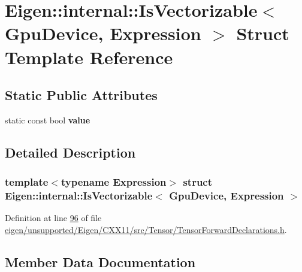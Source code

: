 \hypertarget{struct_eigen_1_1internal_1_1_is_vectorizable_3_01_gpu_device_00_01_expression_01_4}{}\section{Eigen\+:\+:internal\+:\+:Is\+Vectorizable$<$ Gpu\+Device, Expression $>$ Struct Template Reference}
\label{struct_eigen_1_1internal_1_1_is_vectorizable_3_01_gpu_device_00_01_expression_01_4}
\subsection*{Static Public Attributes}
\begin{DoxyCompactItemize}
\item 
static const bool {\bfseries value}
\end{DoxyCompactItemize}


\subsection{Detailed Description}
\subsubsection*{template$<$typename Expression$>$\newline
struct Eigen\+::internal\+::\+Is\+Vectorizable$<$ Gpu\+Device, Expression $>$}



Definition at line \hyperlink{eigen_2unsupported_2_eigen_2_c_x_x11_2src_2_tensor_2_tensor_forward_declarations_8h_source_l00096}{96} of file \hyperlink{eigen_2unsupported_2_eigen_2_c_x_x11_2src_2_tensor_2_tensor_forward_declarations_8h_source}{eigen/unsupported/\+Eigen/\+C\+X\+X11/src/\+Tensor/\+Tensor\+Forward\+Declarations.\+h}.



\subsection{Member Data Documentation}
\mbox{\label{struct_eigen_1_1internal_1_1_is_vectorizable_3_01_gpu_device_00_01_expression_01_4_a3f8c4b5e8833879e8b7a06af12e151e7}} 
